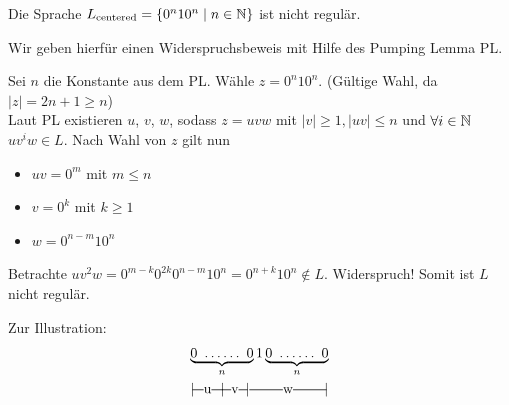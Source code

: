%
\begin{Bsp*}
        Die Sprache $L_\text{centered}=\{0^n10^n \mid n\in\mathbb{N}\}$ ist nicht regulär.
        
        Wir geben hierfür einen Widerspruchsbeweis mit Hilfe des Pumping Lemma \ac{PL}.
        
        Sei $n$ die Konstante aus dem \ac{PL}. Wähle $z=0^n10^n$. 
        (Gültige Wahl, da $|z|=2n+1\geq n$)\\
        Laut PL existieren $u$, $v$, $w$, sodass $z=uvw$ mit $|v|\geq 1, |uv|\leq n$ und $\forall i \in \mathbb{N}$ $uv^iw \in L$. 
        Nach Wahl von $z$ gilt nun
  \begin{itemize}
  \item $uv = 0^m$ mit $m\leq n$
  \item $v = 0^k$ mit $k\geq 1$
  \item $w = 0^{n-m}10^n$ 
  \end{itemize}
  Betrachte $uv^2w = 0^{m-k}0^{2k}0^{n-m}10^n = 0^{n+k}10^n \notin L$. Widerspruch!
  Somit ist $L$ nicht regulär.
  
  Zur Illustration:
        \begin{gather*}
                \underbrace{0\ \dots\dots\ 0}_{n} 1 \underbrace{0\ \dots\dots\ 0}_{n}\\
                |\!\ruleplaceholder[u]{\widthof{0\ \dots }} \!|\! \ruleplaceholder[v]{\widthof{\dots 0}}\!|%
                \ruleplaceholder[w]{\widthof{\ \ \ $1\ \dots\dots\ 1$}}\!|
        \end{gather*}
\end{Bsp*}

